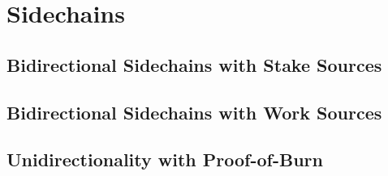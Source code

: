 \chapter{Sidechains}\label{chapter:sidechains}

\section{Bidirectional Sidechains with Stake Sources}








\section{Bidirectional Sidechains with Work Sources}





\section{Unidirectionality with Proof-of-Burn}










